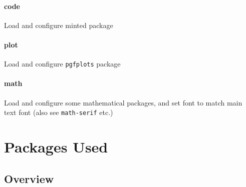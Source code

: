 \documentclass[solid,math,chem,code,plot,gloss]{bmc}
\begin{document}
\paragraph{\ttfamily code}
Load and configure minted package

\paragraph{\ttfamily plot}
Load and configure \texttt{pgfplots} package

\paragraph{\ttfamily math}
Load and configure some mathematical packages, and set font to match main text font (also see \texttt{math-serif} etc.)

\newpage
\section{Packages Used}

\subsection{Overview}
\end{document}
